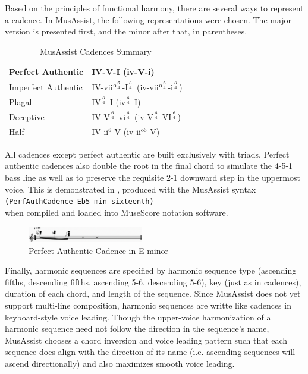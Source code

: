\documentclass{article}
\begin{document}
Based on the principles of functional harmony, there are several ways to represent a cadence. 
In MusAssist, the following representations were chosen. The major version is presented first, 
and the minor after that, in parentheses.

\begin{table}[h]
  \begin{center}
    \renewcommand{\arraystretch}{1.5}
\begin{tabular}{|l|l|}
\hline
Perfect Authentic & IV-V-I (iv-V-i) \\ \hline
Imperfect Authentic & IV-vii$^{\text{o}{6 \atop 4}}$-I$^{6 \atop 4}$ (iv-vii$^{\text{o}{6 \atop 4}}$-i$^{6 \atop 4}$) \\ \hline
Plagal & IV$^{6 \atop 4}$-I (iv$^{6 \atop 4}$-I) \\ \hline
Deceptive & IV-V$^{6 \atop 4}$-vi$^{6 \atop 4}$ (iv-V$^{6 \atop 4}$-VI$^{6 \atop 4}$) \\ \hline
Half & IV-ii$^6$-V (iv-ii$^{\text{o}6}$-V) \\ \hline
\end{tabular}
\caption{MusAssist Cadences Summary}
\end{center}
\label{table:cadences}
\vspace{-7mm}
\end{table}

All cadences except perfect authentic are built exclusively with triads.
Perfect authentic cadences also double the root in the final chord to simulate the 4-5-1 bass line
as well as to preserve the requisite 2-1 downward step in the uppermost voice. 
This is demonstrated in , produced with the MusAssist syntax \\
\noindent\verb.(PerfAuthCadence Eb5 min sixteenth). \\
when compiled and loaded into MuseScore notation software.
\begin{figure}[h!]
\centering
\includegraphics[width=0.45\textwidth]{images/perfauth}
  \caption{Perfect Authentic Cadence in E\musFlat\; minor \label{fig:perfauth}}
\end{figure}

Finally, harmonic sequences are specified by harmonic sequence type (ascending fifths,
descending fifths, ascending 5-6, descending 5-6), key (just as in cadences), duration of each chord,
and length of the sequence. Since MusAssist does not yet support multi-line composition, harmonic sequences are 
writte like cadences in keyboard-style voice leading. Though the
upper-voice harmonization of a harmonic sequence need not follow the direction in the sequence’s
name, MusAssist chooses a chord inversion and voice leading pattern such that each sequence does
align with the direction of its name (i.e. ascending sequences will ascend directionally) 
and also maximizes smooth voice leading.
\end{document}
